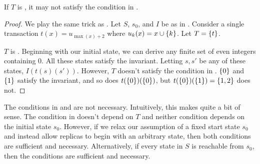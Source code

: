 \begin{claim}
  If $T$ is \Iconfluent, it may not satisfy the condition in
  .
\end{claim}
\begin{proof}
  We play the same trick as . Let $S$, $s_0$,
  and $I$ be as in . Consider a single
  transaction $t(x) = u_{\max(x) + 2}$ where $u_k(x) = x \cup \{k\}$. Let $T
  = \{t\}$.

  $T$ is \Iconfluent{}. Beginning with our initial state, we can derive any
  finite set of even integers containing $0$. All these states satisfy the
  invariant. Letting $s, s'$ be any of these states, $I(t(s)(s'))$.
  However, $T$ doesn't satisfy the condition in .
  $\{0\}$ and $\{1\}$ satisfy the invariant, and so does
  $t(\{0\})(\{0\})$, but $t(\{0\})(\{1\}) = \{1, 2\}$ does not.
\end{proof}


The conditions in  and 
are not necessary. Intuitively, this makes quite a bit of sense. The condition
in  doesn't depend on $T$ and neither condition
depends on the initial state $s_0$. However, if we relax our assumption of a
fixed start state $s_0$ and instead allow replicas to begin with an arbitrary
state, then both conditions are sufficient and necessary. Alternatively, if
every state in $S$ is reachable from $s_0$, then the conditions are sufficient
and necessary.



